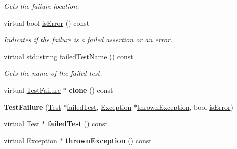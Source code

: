 \begin{DoxyCompactItemize}
\begin{DoxyCompactList}\small\item\em Gets the failure location. \end{DoxyCompactList}\item 
\hypertarget{class_test_failure_a0b6c1ee50d2186a4918f015d7879e8dd}{virtual bool \hyperlink{class_test_failure_a0b6c1ee50d2186a4918f015d7879e8dd}{is\+Error} () const }\label{class_test_failure_a0b6c1ee50d2186a4918f015d7879e8dd}

\begin{DoxyCompactList}\small\item\em Indicates if the failure is a failed assertion or an error. \end{DoxyCompactList}\item 
\hypertarget{class_test_failure_af2f5978f08aa97106acdb09a57807a0e}{virtual std\+::string \hyperlink{class_test_failure_af2f5978f08aa97106acdb09a57807a0e}{failed\+Test\+Name} () const }\label{class_test_failure_af2f5978f08aa97106acdb09a57807a0e}

\begin{DoxyCompactList}\small\item\em Gets the name of the failed test. \end{DoxyCompactList}\item 
\hypertarget{class_test_failure_aeba45f44e148dc01146c615da438ab91}{virtual \hyperlink{class_test_failure}{Test\+Failure} $\ast$ {\bfseries clone} () const }\label{class_test_failure_aeba45f44e148dc01146c615da438ab91}

\item 
\hypertarget{class_test_failure_a0ecf7ad4ab673974d30d10ffb2b01790}{{\bfseries Test\+Failure} (\hyperlink{class_test}{Test} $\ast$\hyperlink{class_test_failure_a8c7da6077f68897785a69cea6c2b7825}{failed\+Test}, \hyperlink{class_exception}{Exception} $\ast$\hyperlink{class_test_failure_ac12b8f4d9a6a1f130834cf08287d869d}{thrown\+Exception}, bool \hyperlink{class_test_failure_a0b6c1ee50d2186a4918f015d7879e8dd}{is\+Error})}\label{class_test_failure_a0ecf7ad4ab673974d30d10ffb2b01790}

\item 
\hypertarget{class_test_failure_a35aa1b953feff8635c832a53d3c6946d}{virtual \hyperlink{class_test}{Test} $\ast$ {\bfseries failed\+Test} () const }\label{class_test_failure_a35aa1b953feff8635c832a53d3c6946d}

\item 
\hypertarget{class_test_failure_a8e60e0c1ea068bef6c546d20d8260400}{virtual \hyperlink{class_exception}{Exception} $\ast$ {\bfseries thrown\+Exception} () const }\label{class_test_failure_a8e60e0c1ea068bef6c546d20d8260400}


\end{DoxyCompactItemize}
